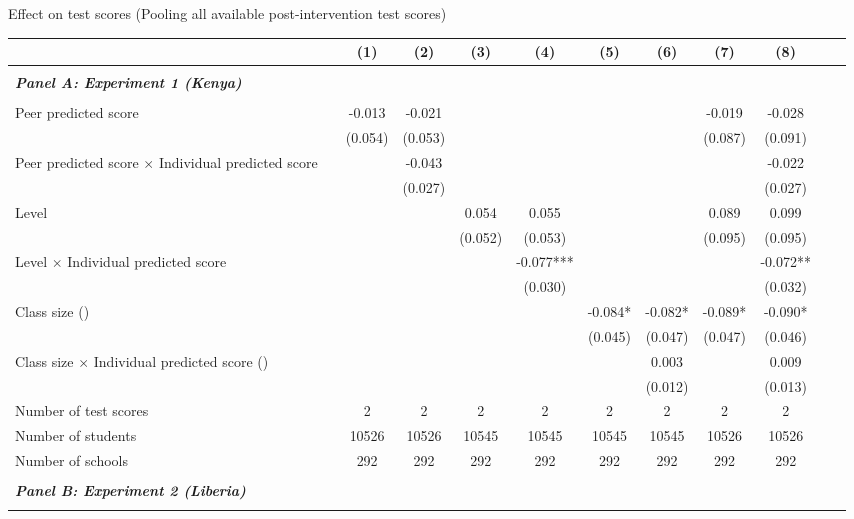 \begin{center} 
\caption{\small Effect on test scores (Pooling all available post-intervention test scores)} 
\label{tab:descriptives} 
\begin{scriptsize}
\begin{threeparttable}
\begin{tabular} {@{} l l c c c c c c c c c c  @{}} \toprule \toprule
& &(1)&(2)&(3)&(4)&(5)&(6)&(7)&(8) \\ \midrule 
\\
\multicolumn{3}{l}{\textbf{\textit{Panel A: Experiment 1 (Kenya)}}} \\
\\
Peer predicted score &  & -0.013 & -0.021 &  &  &  &  & -0.019 & -0.028 \\
                 &  & (0.054) & (0.053) &  &  &  &  & (0.087) & (0.091) \\
Peer predicted score $\times$ Individual predicted score &  &  & -0.043 &  &  &  &  &  & -0.022 \\
                 &  &  & (0.027) &  &  &  &  &  & (0.027) \\
Level &  &  &  & 0.054 & 0.055 &  &  & 0.089 & 0.099 \\
                 &  &  &  & (0.052) & (0.053) &  &  & (0.095) & (0.095) \\
Level $\times$ Individual predicted score &  &  &  &  & -0.077*** &  &  &  & -0.072** \\
                 &  &  &  &  & (0.030) &  &  &  & (0.032) \\
Class size (\times 10) &  &  &  &  &  & -0.084* & -0.082* & -0.089* & -0.090* \\
                 &  &  &  &  &  & (0.045) & (0.047) & (0.047) & (0.046) \\
Class size $\times$ Individual predicted score (\times 10) &  &  &  &  &  &  & 0.003 &  & 0.009 \\
                 &  &  &  &  &  &  & (0.012) &  & (0.013) \\
\midrule
Number of test scores &  & 2 & 2 & 2 & 2 & 2 & 2 & 2 & 2 \\
Number of students &  & 10526 & 10526 & 10545 & 10545 & 10545 & 10545 & 10526 & 10526 \\
Number of schools &  & 292 & 292 & 292 & 292 & 292 & 292 & 292 & 292 \\
 \midrule
\\
\multicolumn{3}{l}{\textbf{\textit{Panel B: Experiment 2 (Liberia)}}} \\
\\

\end{tabular}
\end{threeparttable}
\end{scriptsize}
\end{center}
